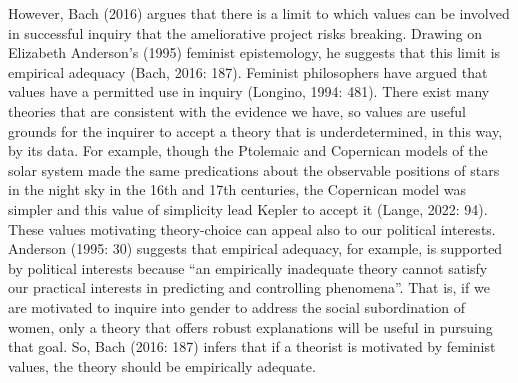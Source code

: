 However, Bach (2016) argues that there is a limit to which values can be
involved in successful inquiry that the ameliorative project risks
breaking. Drawing on Elizabeth Anderson's (1995) feminist epistemology,
he suggests that this limit is empirical adequacy (Bach, 2016: 187).
Feminist philosophers have argued that values have a permitted use in
inquiry (Longino, 1994: 481). There exist many theories that are
consistent with the evidence we have, so values are useful grounds for
the inquirer to accept a theory that is underdetermined, in this way, by
its data. For example, though the Ptolemaic and Copernican models of the
solar system made the same predications about the observable positions
of stars in the night sky in the 16th and 17th centuries, the Copernican
model was simpler and this value of simplicity lead Kepler to accept it
(Lange, 2022: 94). These values motivating theory-choice can appeal also
to our political interests. Anderson (1995: 30) suggests that empirical
adequacy, for example, is supported by political interests because ``an
empirically inadequate theory cannot satisfy our practical interests in
predicting and controlling phenomena''. That is, if we are motivated to
inquire into gender to address the social subordination of women, only a
theory that offers robust explanations will be useful in pursuing that
goal. So, Bach (2016: 187) infers that if a theorist is motivated by
feminist values, the theory should be empirically adequate.

